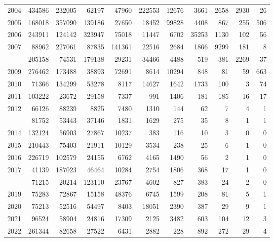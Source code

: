 \documentclass[
]{article}
\begin{document}
\begin{longtable}[t]{lrrrrrrrrrr}
2004 & 434586 & 232005 & 62197 & 47960 & 222553 & 12676 & 3661 & 2658 & 2930 & 26\\
2005 & 168018 & 357090 & 139186 & 27650 & 18452 & 99828 & 4408 & 867 & 255 & 506\\
2006 & 243911 & 124142 & 323947 & 75018 & 11447 & 6702 & 35253 & 1130 & 102 & 56\\
2007 & 88962 & 227061 & 87835 & 141361 & 22516 & 2684 & 1866 & 9299 & 181 & 8\\
\addlinespace
2008 & 205158 & 74531 & 179138 & 29231 & 34466 & 4488 & 519 & 381 & 2269 & 37\\
2009 & 276462 & 173488 & 38893 & 72691 & 8614 & 10294 & 848 & 81 & 59 & 663\\
2010 & 71366 & 134299 & 53278 & 8117 & 14627 & 1642 & 1733 & 100 & 3 & 74\\
2011 & 103222 & 23672 & 29158 & 7337 & 991 & 1406 & 181 & 185 & 16 & 17\\
2012 & 66126 & 88239 & 8825 & 7480 & 1310 & 144 & 62 & 7 & 4 & 1\\
\addlinespace
2013 & 81752 & 53443 & 37146 & 1831 & 1629 & 275 & 35 & 8 & 1 & 1\\
2014 & 132124 & 56903 & 27867 & 10237 & 383 & 116 & 10 & 3 & 0 & 0\\
2015 & 210443 & 75403 & 21911 & 10129 & 3534 & 238 & 25 & 6 & 1 & 0\\
2016 & 226719 & 102579 & 24155 & 6762 & 4165 & 1490 & 56 & 2 & 1 & 0\\
2017 & 41139 & 187023 & 46464 & 10284 & 2754 & 1806 & 368 & 17 & 1 & 0\\
\addlinespace
2018 & 71215 & 20214 & 123110 & 23767 & 4602 & 827 & 383 & 24 & 2 & 0\\
2019 & 75283 & 72867 & 15158 & 48376 & 6745 & 1599 & 208 & 81 & 5 & 1\\
2020 & 75213 & 52516 & 54497 & 8403 & 18051 & 2390 & 387 & 29 & 9 & 1\\
2021 & 96524 & 58904 & 24816 & 17309 & 2125 & 3482 & 603 & 104 & 12 & 3\\
2022 & 261344 & 82658 & 27522 & 6431 & 2882 & 228 & 892 & 272 & 29 & 4\\*
\end{longtable}
\end{document}

